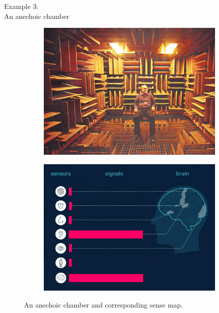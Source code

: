 \documentclass{article}
\begin{document}
\pagebreak

\begin{center}
  \LARGE{Example 3:}\\
  \LARGE{An anechoic chamber}
\end{center}

\begin{figure}[h!]
  \centering
  \begin{subfigure}[b]{0.48\linewidth}
    \includegraphics[width=\linewidth]{images/attention3-chamber.png}
  \end{subfigure}
  \begin{subfigure}[b]{0.48\linewidth}
    \includegraphics[width=\linewidth]{images/ma-anechoic-chamber.png}
  \end{subfigure}
  \caption{An anechoic chamber and corresponding sense map.}
  \label{fig:anechoic-chamber}
\end{figure}
\end{document}
